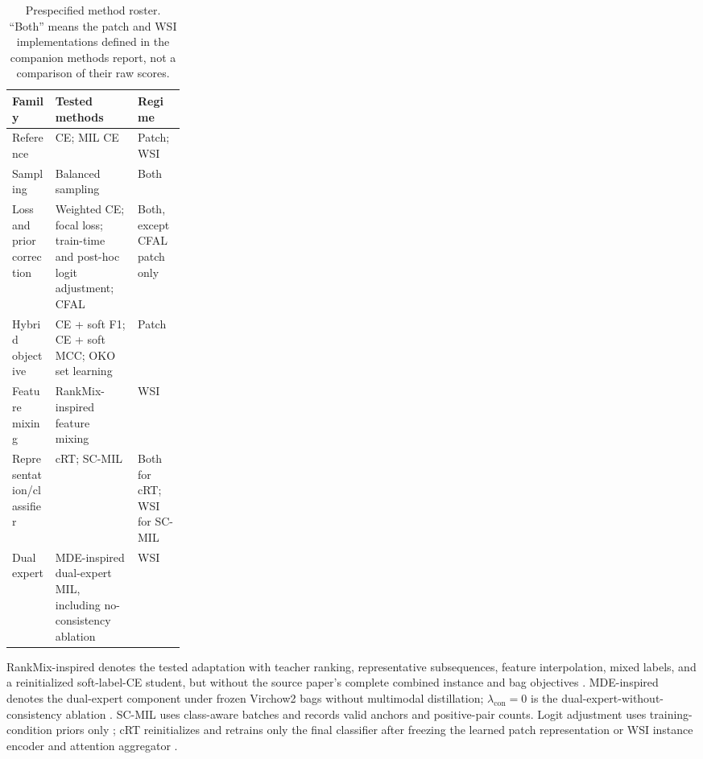 \documentclass[11pt]{article}
\begin{document}
\begin{table}[ht]
  \centering
  \footnotesize
  \begin{tabularx}{\linewidth}{@{}p{0.25\linewidth}Xl@{}}
    \toprule
    Family & Tested methods & Regime \\
    \midrule
    Reference & CE; MIL CE & Patch; WSI \\
    Sampling & Balanced sampling & Both \\
    Loss and prior correction & Weighted CE; focal loss; train-time and post-hoc logit adjustment; CFAL & Both, except CFAL patch only \\
    Hybrid objective & CE + soft F1; CE + soft MCC; OKO set learning & Patch \\
    Feature mixing & RankMix-inspired feature mixing & WSI \\
    Representation/classifier & cRT; SC-MIL & Both for cRT; WSI for SC-MIL \\
    Dual expert & MDE-inspired dual-expert MIL, including no-consistency ablation & WSI \\
    \bottomrule
  \end{tabularx}
  \caption{Prespecified method roster. ``Both'' means the patch and WSI implementations defined in the companion methods report, not a comparison of their raw scores.}
  \label{tab:roster}
\end{table}

RankMix-inspired denotes the tested adaptation with teacher ranking, representative subsequences, feature interpolation, mixed labels, and a reinitialized soft-label-CE student, but without the source paper's complete combined instance and bag objectives \citep{chen2023rankmix}. MDE-inspired denotes the dual-expert component under frozen Virchow2 bags without multimodal distillation; $\lambda_{\mathrm{con}}=0$ is the dual-expert-without-consistency ablation \citep{ling2025mdeMil}. SC-MIL uses class-aware batches and records valid anchors and positive-pair counts. Logit adjustment uses training-condition priors only \citep{menon2021longTail}; cRT reinitializes and retrains only the final classifier after freezing the learned patch representation or WSI instance encoder and attention aggregator \citep{kang2020decouplingRepresentation}.
\end{document}
